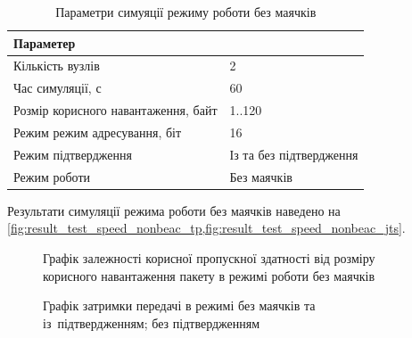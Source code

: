 \documentclass[a4paper,ukrainian,utf8,nocolumnsxix,floatsection,equationsection]{eskdtext}
\begin{document}
\begin{table}[htbp]
\caption{Параметри симуяції режиму роботи без маячків}
\centering
\begin{tabular}{|l|l|}
	\hline
	Параметер                           &                         \\ \hline
	Кількість вузлів                    & 2                       \\ \hline
	Час симуляції, с                    & 60                      \\ \hline
	Розмір корисного навантаження, байт & 1..120                  \\ \hline
	Режим режим адресування, біт        & 16                      \\ \hline
	Режим підтвердження                 & Із та без підтвердження \\ \hline
	Режим роботи                        & Без маячків             \\ \hline
\end{tabular}
\label{tbl:simulation_settings_nonbeackon}
\end{table}

Результати симуляції режима роботи без маячків наведено на \cref{fig:result_test_speed_nonbeac_tp,fig:result_test_speed_nonbeac_jts}.

\begin{figure}[bth]
	\centering
	\caption{\label{fig:result_test_speed_nonbeac_tp}Графік залежності корисної пропускної здатності від розміру корисного навантаження пакету в режимі роботи без маячків}
\end{figure}

\begin{figure}[bth]
	\centering
	\caption{Графік затримки передачі в режимі без маячків та 
		\protect{} із~підтвердженням; 
		\protect{} без підтвердженням
		}\label{fig:result_test_speed_nonbeac_jts}
\end{figure}
\end{document}
